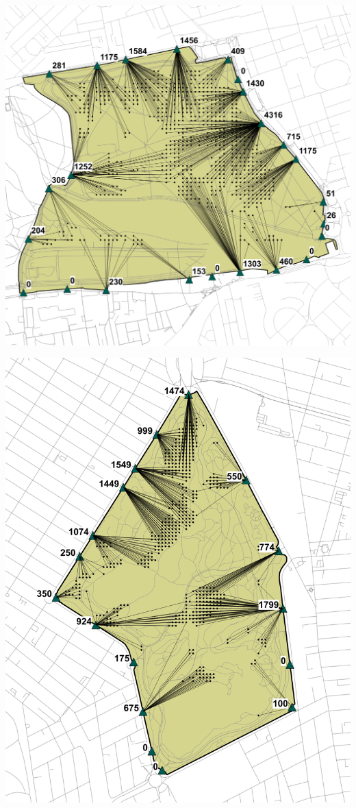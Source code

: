 \begin{multicols}{2}
\begin{minipage}{0.45\textwidth}
    \centering
    \includegraphics[width=\linewidth]{images/network/hyde_gatherings_nearest.png}\par\hspace{3pt} 
    \includegraphics[width=\linewidth]{images/network/prospect_gatherings_nearest.png}\par\hspace{3pt}

\end{minipage}
\end{multicols}
